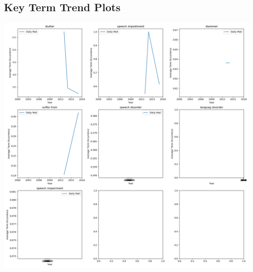 \documentclass{report}
\begin{document}
\subsection{Key Term Trend Plots}
\includegraphics[width=\textwidth]{raw/speech-impairment-terms.png}

\end{document}
